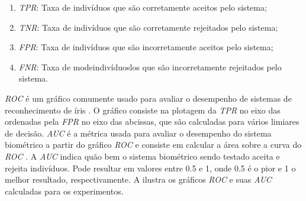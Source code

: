 \begin{enumerate}
    \item \textit{\acrfull{TPR}}: Taxa de indivíduos que são corretamente aceitos pelo sistema;
    \item \textit{\acrfull{TNR}}: Taxa de indivíduos que são corretamente rejeitados pelo sistema;
    \item \textit{\acrfull{FPR}}: Taxa de indivíduos que são incorretamente aceitos pelo sistema;
    \item \textit{\acrfull{FNR}}: Taxa de modeindivíduoslos que são incorretamente rejeitados pelo sistema.
\end{enumerate}

\par \textit{\acrshort{ROC}} é um gráfico comumente usado para avaliar o desempenho de sistemas de reconhecimento de íris \cite{aucROC, daugman2000}. O gráfico consiste na plotagem da \textit{\acrshort{TPR}} no eixo das ordenadas pela \textit{\acrshort{FPR}} no eixo das abcissas, que são calculadas para vários limiares de decisão. \textit{\acrshort{AUC}} é a métrica usada para avaliar o desempenho do sistema biométrico a partir do gráfico \textit{\acrshort{ROC}} e consiste em calcular a área sobre a curva do \textit{\acrshort{ROC}} \cite{aucROC}. A \textit{\acrshort{AUC}} indica quão bem o sistema biométrico sendo testado aceita e rejeita indivíduos. Pode resultar em valores entre 0.5 e 1, onde 0.5 é o pior e 1 o melhor resultado, respectivamente. A  ilustra os gráficos \textit{\acrshort{ROC}} e suas \textit{\acrshort{AUC}} calculadas para os experimentos.

